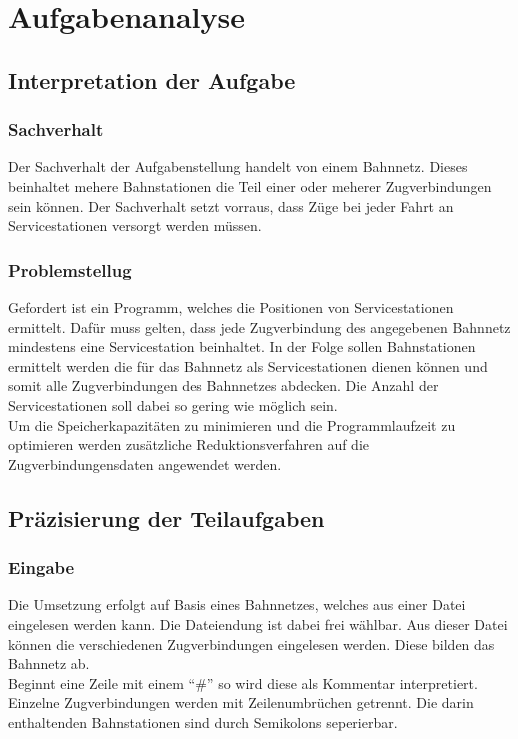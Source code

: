 \chapter{Aufgabenanalyse}\label{ch:aufgabenanalyse}
\section{Interpretation der Aufgabe}\label{sec:interpretation-der-aufgabe}
\subsection{Sachverhalt}\label{subsec:sachverhalt}
Der Sachverhalt der Aufgabenstellung handelt von einem Bahnnetz. Dieses beinhaltet mehere Bahnstationen die Teil einer oder meherer Zugverbindungen sein können. Der Sachverhalt setzt vorraus, dass Züge bei jeder Fahrt an Servicestationen versorgt werden müssen.
\subsection{Problemstellug}\label{subsec:aufgabenstellung}
Gefordert ist ein Programm, welches die Positionen von Servicestationen ermittelt. Dafür muss gelten, dass jede Zugverbindung des angegebenen Bahnnetz mindestens eine Servicestation beinhaltet. In der Folge sollen Bahnstationen ermittelt werden die für das Bahnnetz als Servicestationen dienen können und somit alle Zugverbindungen des Bahnnetzes abdecken. Die Anzahl der Servicestationen soll dabei so gering wie möglich sein.
\\
Um die Speicherkapazitäten zu minimieren und die Programmlaufzeit zu optimieren werden zusätzliche Reduktionsverfahren auf die Zugverbindungensdaten angewendet werden.\\ 

\section{Präzisierung der Teilaufgaben}\label{subsec:teilaufgaben}
\subsection{Eingabe}\label{subsec:eingabe}
Die Umsetzung erfolgt auf Basis eines Bahnnetzes, welches aus einer Datei eingelesen werden kann. Die Dateiendung ist dabei frei wählbar. Aus dieser Datei können die verschiedenen Zugverbindungen eingelesen werden. Diese bilden das Bahnnetz ab.\\
Beginnt eine Zeile mit einem \enquote{\#} so wird diese als Kommentar interpretiert. Einzelne Zugverbindungen werden mit Zeilenumbrüchen getrennt. Die darin enthaltenden Bahnstationen sind durch Semikolons seperierbar.\\

